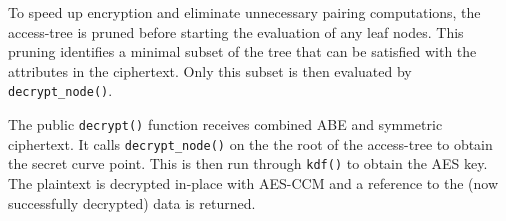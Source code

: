 To speed up encryption and eliminate unnecessary pairing computations, the \gls{access-tree} is pruned before starting the evaluation of any leaf nodes.
This pruning identifies a minimal subset of the tree that can be satisfied with the attributes in the ciphertext.
Only this subset is then evaluated by \verb+decrypt_node()+.

The public \verb+decrypt()+ function receives combined ABE and symmetric ciphertext. 
It calls \verb.decrypt_node(). on the the root of the \gls{access-tree} to obtain the secret curve point.
This is then run through \verb+kdf()+ to obtain the AES key.
The plaintext is decrypted in-place with AES-CCM and a reference to the (now successfully decrypted) data is returned.



